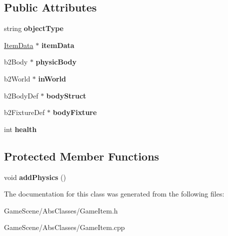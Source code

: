 \subsection*{Public Attributes}
\begin{DoxyCompactItemize}
\item 
string {\bfseries object\+Type}\hypertarget{classGameItem_a61814b6ad3ce20f5a8c69b43aa70379f}{}\label{classGameItem_a61814b6ad3ce20f5a8c69b43aa70379f}

\item 
\hyperlink{classItemData}{Item\+Data} $\ast$ {\bfseries item\+Data}\hypertarget{classGameItem_a00c0e196fe078eff9537af96827d9592}{}\label{classGameItem_a00c0e196fe078eff9537af96827d9592}

\item 
b2\+Body $\ast$ {\bfseries physic\+Body}\hypertarget{classGameItem_ac6324482db1a810a8aff077de71c9545}{}\label{classGameItem_ac6324482db1a810a8aff077de71c9545}

\item 
b2\+World $\ast$ {\bfseries in\+World}\hypertarget{classGameItem_a9c7ff677c89283296599f71d343cb607}{}\label{classGameItem_a9c7ff677c89283296599f71d343cb607}

\item 
b2\+Body\+Def $\ast$ {\bfseries body\+Struct}\hypertarget{classGameItem_a7a5131c14523447b600b7d4c65ded5b4}{}\label{classGameItem_a7a5131c14523447b600b7d4c65ded5b4}

\item 
b2\+Fixture\+Def $\ast$ {\bfseries body\+Fixture}\hypertarget{classGameItem_af20e53bedd210dd932493f21edbce5c0}{}\label{classGameItem_af20e53bedd210dd932493f21edbce5c0}

\item 
int {\bfseries health}\hypertarget{classGameItem_afa8d755b9557175edb2f4dc117900f3f}{}\label{classGameItem_afa8d755b9557175edb2f4dc117900f3f}

\end{DoxyCompactItemize}
\subsection*{Protected Member Functions}
\begin{DoxyCompactItemize}
\item 
void {\bfseries add\+Physics} ()\hypertarget{classGameItem_a22085b8c5a551d90d4132d0907b5439c}{}\label{classGameItem_a22085b8c5a551d90d4132d0907b5439c}

\end{DoxyCompactItemize}


The documentation for this class was generated from the following files\+:\begin{DoxyCompactItemize}
\item 
Game\+Scene/\+Abs\+Classes/Game\+Item.\+h\item 
Game\+Scene/\+Abs\+Classes/Game\+Item.\+cpp\end{DoxyCompactItemize}
